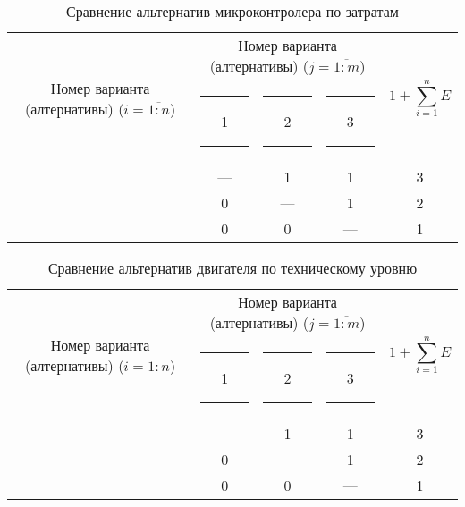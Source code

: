 \begin{table}[H]
    \centering
    \begin{tabular}{|c|c|c|c|c|}
        \hline
        \multirow{2}{2.4cm}[-0.5pc]{
            \centering
            Номер варианта (алтернативы) ($i = \overline{1:n}$)
        } &
        \multicolumn{3}{c|}{
            \parbox[t]{2.4cm}{
                \centering
                Номер варианта (алтернативы) ($j = \overline{1:m}$)
            }
        } &
        \multirow{2}{1.7cm}{
            \centering
            $$1 + \sum_{i=1}^n E$$
        } \\
        &
        \centering \rule{2pt}{0pt} 1 \rule{2pt}{0pt} &
        \centering \rule{2pt}{0pt} 2 \rule{2pt}{0pt} &
        \centering \rule{2pt}{0pt} 3 \rule{2pt}{0pt} & \\
        \hline \hline
        \centering{1} &---& 1 & 1 & 3 \\ \hline
        \centering{2} & 0 &---& 1 & 2 \\ \hline
        \centering{3} & 0 & 0 &---& 1 \\ \hline
    \end{tabular}
    \caption{Сравнение альтернатив микроконтролера по затратам}
    \label{tbl_mcu_cost_lvl_comparison}
\end{table}

\begin{table}[H]
    \centering
    \begin{tabular}{|c|c|c|c|c|}
        \hline
        \multirow{2}{2.4cm}[-0.5pc]{
            \centering
            Номер варианта (алтернативы) ($i = \overline{1:n}$)
        } &
        \multicolumn{3}{c|}{
            \parbox[t]{2.4cm}{
                \centering
                Номер варианта (алтернативы) ($j = \overline{1:m}$)
            }
        } &
        \multirow{2}{1.7cm}{
            \centering
            $$1 + \sum_{i=1}^n E$$
        } \\
        &
        \centering \rule{2pt}{0pt} 1 \rule{2pt}{0pt} &
        \centering \rule{2pt}{0pt} 2 \rule{2pt}{0pt} &
        \centering \rule{2pt}{0pt} 3 \rule{2pt}{0pt} & \\
        \hline \hline
        \centering{1} &---& 1 & 1 & 3 \\ \hline
        \centering{2} & 0 &---& 1 & 2 \\ \hline
        \centering{3} & 0 & 0 &---& 1 \\ \hline
    \end{tabular}
    \caption{Сравнение альтернатив двигателя по техническому уровню}
    \label{tbl_motor_tech_lvl_comparison}
\end{table}

